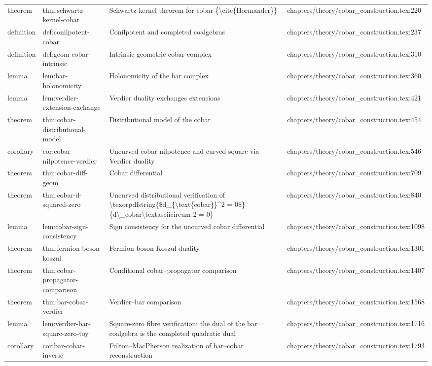 \documentclass[11pt]{article}
\begin{document}
\begin{longtable}{L{0.10\textwidth}L{0.26\textwidth}L{0.42\textwidth}L{0.22\textwidth}}
theorem & thm:schwartz-kernel-cobar & Schwartz kernel theorem for cobar \{\textbackslash{}cite\{Hormander\}\} & chapters/theory/cobar\_construction.tex:220\\
definition & def:conilpotent-cobar & Conilpotent and completed coalgebras & chapters/theory/cobar\_construction.tex:237\\
definition & def:geom-cobar-intrinsic & Intrinsic geometric cobar complex & chapters/theory/cobar\_construction.tex:310\\
lemma & lem:bar-holonomicity & Holonomicity of the bar complex & chapters/theory/cobar\_construction.tex:360\\
lemma & lem:verdier-extension-exchange & Verdier duality exchanges extensions & chapters/theory/cobar\_construction.tex:421\\
theorem & thm:cobar-distributional-model & Distributional model of the cobar & chapters/theory/cobar\_construction.tex:454\\
corollary & cor:cobar-nilpotence-verdier & Uncurved cobar nilpotence and curved square via Verdier duality & chapters/theory/cobar\_construction.tex:546\\
theorem & thm:cobar-diff-geom & Cobar differential & chapters/theory/cobar\_construction.tex:709\\
theorem & thm:cobar-d-squared-zero & Uncurved distributional verification of \textbackslash{}texorpdfstring\{\$d\_\{\textbackslash{}text\{cobar\}\}\textasciicircum{}2 = 0\$\}\{d\textbackslash{}\_cobar\textbackslash{}textasciicircum 2 = 0\} & chapters/theory/cobar\_construction.tex:840\\
lemma & lem:cobar-sign-consistency & Sign consistency for the uncurved cobar differential & chapters/theory/cobar\_construction.tex:1098\\
theorem & thm:fermion-boson-koszul & Fermion-boson Koszul duality & chapters/theory/cobar\_construction.tex:1301\\
theorem & thm:cobar-propagator-comparison & Cond{}itional cobar--propagator comparison & chapters/theory/cobar\_construction.tex:1407\\
theorem & thm:bar-cobar-verdier & Verdier--bar comparison & chapters/theory/cobar\_construction.tex:1568\\
lemma & lem:verdier-bar-square-zero-toy & Square-zero fibre verification: the dual of the bar coalgebra is the completed quadratic dual & chapters/theory/cobar\_construction.tex:1716\\
corollary & cor:bar-cobar-inverse & Fulton--MacPherson realization of bar--cobar reconstruction & chapters/theory/cobar\_construction.tex:1793\\

\end{longtable}
\end{document}
